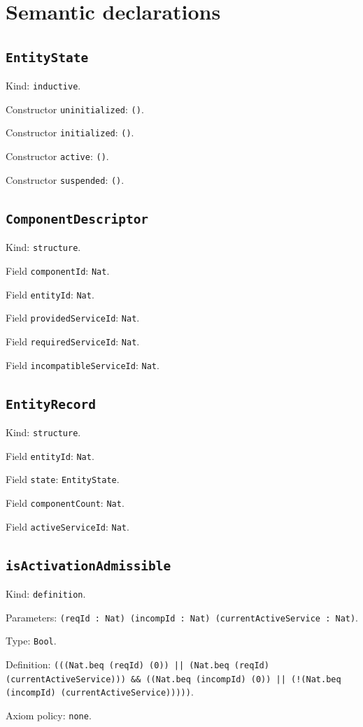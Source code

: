 \documentclass[11pt]{article}
\begin{document}
\section*{Semantic declarations}
\subsection*{\texttt{EntityState}}
\noindent Kind: \texttt{inductive}.\par
\noindent Constructor \texttt{uninitialized}: \texttt{()}.\par
\noindent Constructor \texttt{initialized}: \texttt{()}.\par
\noindent Constructor \texttt{active}: \texttt{()}.\par
\noindent Constructor \texttt{suspended}: \texttt{()}.\par
\subsection*{\texttt{ComponentDescriptor}}
\noindent Kind: \texttt{structure}.\par
\noindent Field \texttt{componentId}: \texttt{Nat}.\par
\noindent Field \texttt{entityId}: \texttt{Nat}.\par
\noindent Field \texttt{providedServiceId}: \texttt{Nat}.\par
\noindent Field \texttt{requiredServiceId}: \texttt{Nat}.\par
\noindent Field \texttt{incompatibleServiceId}: \texttt{Nat}.\par
\subsection*{\texttt{EntityRecord}}
\noindent Kind: \texttt{structure}.\par
\noindent Field \texttt{entityId}: \texttt{Nat}.\par
\noindent Field \texttt{state}: \texttt{EntityState}.\par
\noindent Field \texttt{componentCount}: \texttt{Nat}.\par
\noindent Field \texttt{activeServiceId}: \texttt{Nat}.\par
\subsection*{\texttt{isActivationAdmissible}}
\noindent Kind: \texttt{definition}.\par
\noindent Parameters: \texttt{(reqId : Nat) (incompId : Nat) (currentActiveService : Nat)}.\par
\noindent Type: \texttt{Bool}.\par
\noindent Definition: \texttt{(((Nat.beq (reqId) (0)) || (Nat.beq (reqId) (currentActiveService))) \&\& ((Nat.beq (incompId) (0)) || (!(Nat.beq (incompId) (currentActiveService)))))}.\par
\noindent Axiom policy: \texttt{none}.\par
\end{document}
